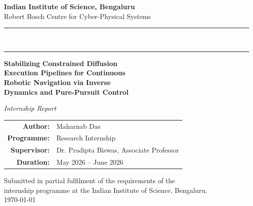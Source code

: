 \documentclass[12pt, a4paper, oneside]{report}
\theoremstyle{definition}
\begin{document}
\def\Call#1#2{#1(#2)}

\begin{titlepage}
  \centering
  \vspace*{0.8cm}

  {\Large\bfseries Indian Institute of Science, Bengaluru}\\[0.25cm]
  {\normalsize Robert Bosch Centre for Cyber-Physical Systems}\\[0.1cm]
  \rule{\linewidth}{0.6pt}\\[-0.1cm]
  \rule{\linewidth}{0.15pt}

  \vspace{1.6cm}

  {\LARGE\bfseries\color{iiscblue}
   Stabilizing Constrained Diffusion\\[0.35cm]
   Execution Pipelines for Continuous\\[0.35cm]
   Robotic Navigation via Inverse\\[0.35cm]
   Dynamics and Pure-Pursuit Control}

  \vspace{1.6cm}
  {\large\itshape Internship Report}\\[0.8cm]

  \begin{tabular}{r@{\hskip 0.5em}l}
    \textbf{Author:}     & Maharnab Das                                \\[5pt]
    \textbf{Programme:}  & Research Internship                         \\[5pt]
    \textbf{Supervisor:} & Dr. Pradipta Biswas, Associate Professor    \\[5pt]
    \textbf{Duration:}   & May 2026 -- June 2026                       \\[5pt]
  \end{tabular}

  \vfill
  {\small
   Submitted in partial fulfilment of the requirements of the\\
   internship programme at the Indian Institute of Science, Bengaluru.}\\[0.6cm]
  {\small\today}
\end{titlepage}
\end{document}
